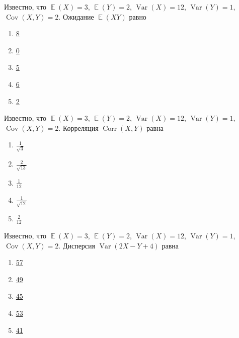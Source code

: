 \documentclass[t]{beamer}
\DeclareMathOperator{\Var}{Var}
\DeclareMathOperator{\Cov}{Cov}
\DeclareMathOperator{\Corr}{Corr}
\DeclareMathOperator{\E}{\mathbb{E}}
\begin{document}
 \begin{frame} \label{11} 
\begin{block}{11} 

  Известно, что $\E(X)=3$, $\E(Y)=2$, $\Var(X)=12$, $\Var(Y)=1$, $\Cov(X,Y)=2$. Ожидание $\E(XY)$ равно
  


 \end{block} 
\begin{enumerate} 
\item[] \hyperlink{11-Yes}{\beamergotobutton{} 8}
\item[] \hyperlink{11-No}{\beamergotobutton{} 0}
\item[] \hyperlink{11-No}{\beamergotobutton{} 5}
\item[] \hyperlink{11-No}{\beamergotobutton{} 6}
\item[] \hyperlink{11-No}{\beamergotobutton{} 2}
\end{enumerate} 
\end{frame} 


 \begin{frame} \label{12} 
\begin{block}{12} 

  Известно, что $\E(X)=3$, $\E(Y)=2$, $\Var(X)=12$, $\Var(Y)=1$, $\Cov(X,Y)=2$. Корреляция $\Corr(X,Y)$ равна
  


 \end{block} 
\begin{enumerate} 
\item[] \hyperlink{12-Yes}{\beamergotobutton{} $\frac{1}{\sqrt{3}}$}
\item[] \hyperlink{12-No}{\beamergotobutton{} $\frac{2}{\sqrt{13}}$}
\item[] \hyperlink{12-No}{\beamergotobutton{} $\frac{1}{12}$}
\item[] \hyperlink{12-No}{\beamergotobutton{} $\frac{1}{\sqrt{12}}$}
\item[] \hyperlink{12-No}{\beamergotobutton{} $\frac{2}{12}$}
\end{enumerate} 
\end{frame} 


 \begin{frame} \label{13} 
\begin{block}{13} 

  Известно, что $\E(X)=3$, $\E(Y)=2$, $\Var(X)=12$, $\Var(Y)=1$, $\Cov(X,Y)=2$. Дисперсия $\Var(2X-Y+4)$ равна
  


 \end{block} 
\begin{enumerate} 
\item[] \hyperlink{13-No}{\beamergotobutton{} 57}
\item[] \hyperlink{13-No}{\beamergotobutton{} 49}
\item[] \hyperlink{13-No}{\beamergotobutton{} 45}
\item[] \hyperlink{13-No}{\beamergotobutton{} 53}
\item[] \hyperlink{13-Yes}{\beamergotobutton{} 41}
\end{enumerate} 
\end{frame} 
\end{document}
